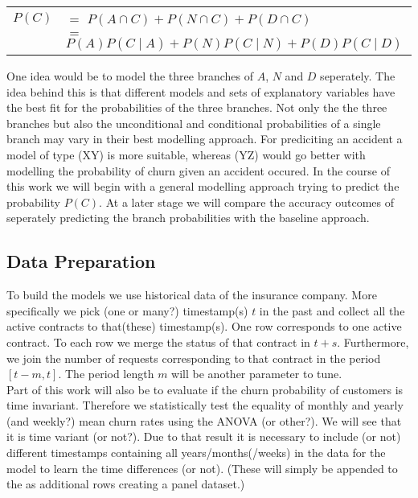 \documentclass[12pt,titlepage]{article}
\begin{document}
\begin{center}
    \begin{tabular}{ll}
        $P(C)$ & $=$ \hspace{3mm} $P(A\cap C) + P(N\cap C) + P(D\cap C)$ \\
        & $=$ \hspace{3mm} $P(A)P(C\mid A) + P(N)P(C\mid N) + P(D)P(C\mid D)$ \\
    \end{tabular}
\end{center} \par

One idea would be to model the three branches of $A$, $N$ and $D$ seperately. The idea behind this is that different models and
sets of explanatory variables have the best fit for the probabilities of the three branches. Not only the the three branches
but also the unconditional and conditional probabilities of a single branch may vary in their best modelling approach. For prediciting
an accident a model of type (XY) is more suitable, whereas (YZ) would go better with modelling the probability of churn given an
accident occured. In the course of this work we will begin with a general modelling approach trying to predict the probability $P(C)$.
At a later stage we will compare the accuracy outcomes of seperately predicting the branch probabilities with the baseline approach. \\

\subsection{Data Preparation} \par

To build the models we use historical data of the insurance company. More specifically we pick (one or many?) timestamp(s) $t$ in the past and
collect all the active contracts to that(these) timestamp(s). One row corresponds to one active contract. To each row we merge the status of that
contract in $t+s$. Furthermore, we join the number of requests corresponding to that contract in the period $[t-m, t]$. The period length $m$
will be another parameter to tune. \\
Part of this work will also be to evaluate if the churn probability of customers is time invariant. Therefore we statistically test the equality of
monthly and yearly (and weekly?) mean churn rates using the ANOVA (or other?). We will see that it is time variant (or not?). Due to that result
it is necessary to include (or not) different timestamps containing all years/months(/weeks) in the data for the model to learn the time differences
(or not). (These will simply be appended to the as additional rows creating a panel dataset.) \\
\end{document}
